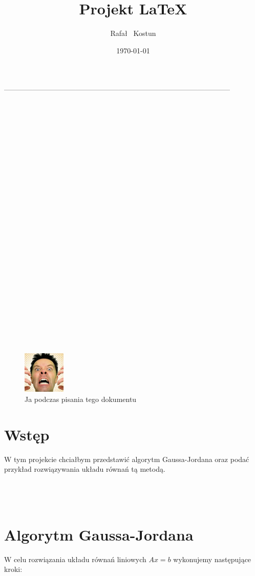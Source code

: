 \documentclass[13pt, a4paper, titlepage]{article}
\author{Rafał ~Kostun}
\title{Projekt \LaTeX}
\date{\today}
\begin{document}
\maketitle

\tableofcontents
-----------------------------------------------------------------------------------------------
\\\\\\\\\\\\\\\\\\\\\\\\\\\\\\\\\\\\\\\\\\\\\\\\\\\\
\begin{figure}[h]
\centering
\includegraphics[width=2cm]{images.jpg}
\caption{Ja podczas pisania tego dokumentu}
\label{fig:images}
\end{figure}
\newpage
\section{Wstęp}

W tym projekcie chciałbym przedstawić algorytm Gaussa-Jordana oraz podać przykład rozwiązywania układu równań tą metodą.
\\\\\\\\



        \section{Algorytm Gaussa-Jordana}
W celu rozwiązania układu równań liniowych \textbf{$Ax = b$} wykonujemy następujące kroki:
\end{document}
